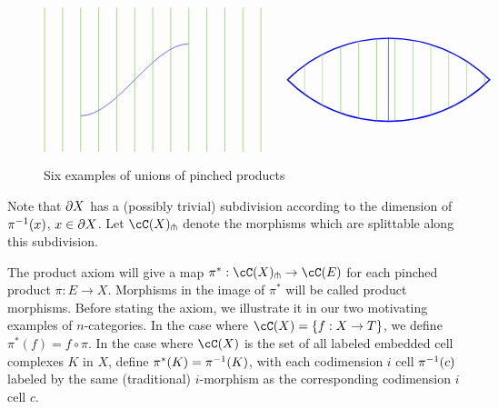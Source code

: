 \begin{figure}[t]
$$\begin{tikzpicture}[baseline=0]
\begin{scope}
\draw[blue] (1,-1) .. controls  (2,-1) and (3,1) .. (4,1);
\foreach \x in {0, 0.5, ..., 6} {
	\draw[green!50!brown] (\x,-2) -- (\x,2);
}
\end{scope}
\end{tikzpicture}
\qquad
\begin{tikzpicture}[baseline=0]
\begin{scope}
\path[clip] (0,0) arc (135:45:4) arc (-45:-135:4);
\draw[blue,line width=2pt] (0,0) arc (135:45:4) arc (-45:-135:4);
\draw[blue] (2.82,-5) -- (2.83,5);
\foreach \x in {0, 0.5, ..., 6} {
	\draw[green!50!brown] (\x,-2) -- (\x,2);
}
\end{scope}
\end{tikzpicture}
$$
\caption{Six examples of unions of pinched products}\label{pinched_prod_unions}
\end{figure}

Note that $\partial X$ has a (possibly trivial) subdivision according to 
the dimension of $\pi^{-1}(x)$, $x\in \partial X$.
Let $\cC(X)\trans{}$ denote the morphisms which are splittable along this subdivision.

The product axiom will give a map $\pi^*:\cC(X)\trans{}\to \cC(E)$ for each pinched product
$\pi:E\to X$.
Morphisms in the image of $\pi^*$ will be called product morphisms.
Before stating the axiom, we illustrate it in our two motivating examples of $n$-categories.
In the case where $\cC(X) = \{f: X\to T\}$, we define $\pi^*(f) = f\circ\pi$.
In the case where $\cC(X)$ is the set of all labeled embedded cell complexes $K$ in $X$, 
define $\pi^*(K) = \pi^{-1}(K)$, with each codimension $i$ cell $\pi^{-1}(c)$ labeled by the
same (traditional) $i$-morphism as the corresponding codimension $i$ cell $c$.


